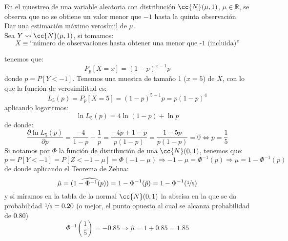 \begin{ejercicio}
    En el muestreo de una variable aleatoria con distribución $\cc{N}(\mu,1)$, $\mu \in \mathbb{R}$, se observa que no se obtiene un valor menor que $-1$ hasta la quinta observación. Dar una estimación máximo verosímil de $\mu$.\\

    \noindent
    Sea $Y\rightsquigarrow\cc{N}(\mu, 1)$, si tomamos:
    \begin{equation*}
        X\equiv \text{``número de observaciones hasta obtener una menor que -1 (incluida)''}
    \end{equation*}

    tenemos que:
    \begin{equation*}
        P_p[X=x] = {(1-p)}^{x-1}p
    \end{equation*}
    donde $p= P[Y<-1]$. Tenemos una muestra de tamaño 1 ($x=5$) de $X$, con lo que la función de verosimilitud es:
    \begin{equation*}
        L_5(p) = P_p[X=5] = {(1-p)}^{5-1}p = p{(1-p)}^{4}
    \end{equation*}
    aplicando logaritmos:
    \begin{equation*}
        \ln L_5(p) = 4\ln(1-p) + \ln p
    \end{equation*}
    de donde:
    \begin{equation*}
        \dfrac{\partial \ln L_5(p)}{\partial p} = \frac{-4}{1-p}+\frac{1}{p} = \frac{-4p+1-p}{p(1-p)} = \frac{1-5p}{p(1-p)} = 0 \Longleftrightarrow p = \frac{1}{5}
    \end{equation*}
    Si notamos por $\Phi$ la función de distribución de una $\cc{N}(0,1)$, tenemos que:
    \begin{equation*}
        p = P[Y< -1] = P[Z<-1-\mu] = \Phi(-1-\mu) \Longrightarrow -1-\mu = \Phi^{-1}(p) \Longrightarrow \mu = 1-\Phi^{-1}(p)
    \end{equation*}
    de donde aplicando el Teorema de Zehna:
    \begin{equation*}
        \hat{\mu} = \widehat{(1-\Phi^{-1}(p))} = 1-\Phi^{-1}(\hat{p}) = 1-\Phi^{-1}(\nicefrac{1}{5})
    \end{equation*}
    y si miramos en la tabla de la normal $\cc{N}(0,1)$ la abscisa en la que se da probabilidad $\nicefrac{1}{5} = 0.20$ (o mejor, el punto opuesto al cual se alcanza probabilidad de $0.80$)
    \begin{equation*}
        \Phi^{-1}\left(\frac{1}{5}\right) = -0.85 \Longrightarrow \hat{\mu} = 1+0.85 = 1.85
    \end{equation*}
\end{ejercicio}

